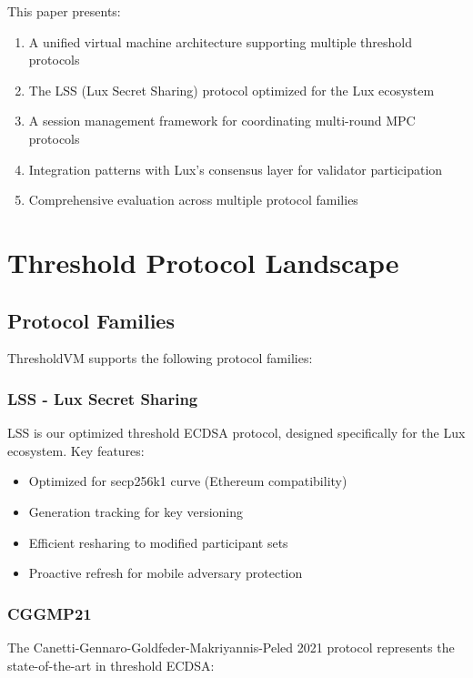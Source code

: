 \documentclass[11pt,twocolumn]{article}
\begin{document}
This paper presents:

\begin{enumerate}
\item A unified virtual machine architecture supporting multiple threshold protocols
\item The LSS (Lux Secret Sharing) protocol optimized for the Lux ecosystem
\item A session management framework for coordinating multi-round MPC protocols
\item Integration patterns with Lux's consensus layer for validator participation
\item Comprehensive evaluation across multiple protocol families
\end{enumerate}

\section{Threshold Protocol Landscape}

\subsection{Protocol Families}

ThresholdVM supports the following protocol families:

\subsubsection{LSS - Lux Secret Sharing}

LSS is our optimized threshold ECDSA protocol, designed specifically for the Lux ecosystem. Key features:

\begin{itemize}
\item Optimized for secp256k1 curve (Ethereum compatibility)
\item Generation tracking for key versioning
\item Efficient resharing to modified participant sets
\item Proactive refresh for mobile adversary protection
\end{itemize}

\subsubsection{CGGMP21}

The Canetti-Gennaro-Goldfeder-Makriyannis-Peled 2021 protocol \cite{cggmp21} represents the state-of-the-art in threshold ECDSA:
\end{document}
